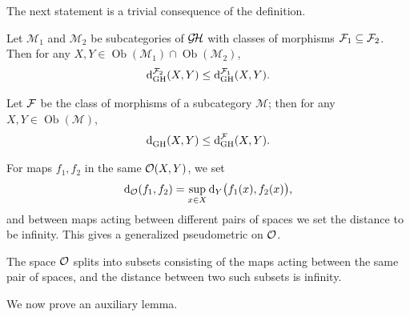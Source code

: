 The next statement is a trivial consequence of the definition.
\begin{proposition}\label{prop:FFmonotone}
  Let $\mathcal{M}_1$ and $\mathcal{M}_2$ be subcategories of $\operatorname{\mathcal{G\!H}}$ with classes of morphisms $\mathcal{F}_1 \subseteq \mathcal{F}_2$.
Then for any $X, Y \in \operatorname{Ob}(\mathcal{M}_1) \cap \operatorname{Ob}(\mathcal{M}_2)$,
  $$
    \operatorname{d}^{\mathcal{F}_2}_{\mathrm{GH}}(X,Y)\le\operatorname{d}^{\mathcal{F}_1}_{\mathrm{GH}}(X,Y).
  $$
\end{proposition}
\begin{corol}\label{proposition:GHleFGH}
Let $\mathcal{F}$ be the class of morphisms of a subcategory $\mathcal{M}$; then for any $X, Y \in \operatorname{Ob}(\mathcal{M})$,
$$
\operatorname{d}^{}_{\mathrm{GH}}(X,Y)\le\operatorname{d}^{\mathcal{F}}_{\mathrm{GH}}(X,Y).
$$
\end{corol}

\begin{define}
  For maps $f_1, f_2$ in the same $\mathcal{O}(X,Y)$, we set
  $$
  \operatorname{d}_{\mathcal{O}}(f_1, f_2) = \underset{x \in X}{\sup} \operatorname{d}_{Y}\bigl(f_1(x), f_2(x)\bigr),
  $$
  and between maps acting between different pairs of spaces we set the distance to be infinity. This gives a generalized pseudometric on $\mathcal{O}$.
\end{define}

The space $\mathcal{O}$ splits into subsets consisting of the maps acting between the same pair of spaces, and the distance between two such subsets is infinity.\par
We now prove an auxiliary lemma.

